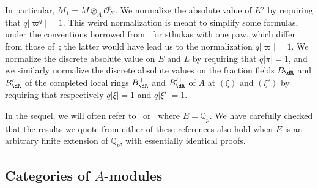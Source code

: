 In particular, $M_{1}=M\otimes_{A}\mathcal{O}_{K}^{\flat}$. We normalize the absolute value of $K^{\flat}$ by requiring that $q\left|\varpi^{q}\right|=1$. This weird normalization is meant to simplify some formulas, under the conventions borrowed from~\cite{BaMoSc16} for sthukas with one paw, which differ from those of~\cite{ScWe15}; the latter would have lead us to the normalization $q\left|\varpi\right|=1$. We normalize the discrete absolute value on $E$ and $L$ by requiring that $q\left|\pi\right|=1$, and we similarly normalize the discrete absolute values on the fraction fields $B_{\dR}$ and $B'_{\dR}$ of the completed local rings $B_{\dR}^{+}$ and $B_{\dR}^{\prime+}$ of $A$ at $(\xi)$ and $(\xi')$ by requiring that respectively $q\left|\xi\right|=1$ and $q\left|\xi'\right|=1$.
\begin{rema}
In the sequel, we will often refer to~\cite{BaMoSc16} or~\cite{ScWe15} where $E=\mathbb{Q}_{p}$. We have carefully checked that the results we quote from either of these references also hold when $E$ is an arbitrary finite extension of $\mathbb{Q}_{p}$, with essentially identical proofs.
\end{rema}

\subsection{Categories of \texorpdfstring{$A$}{A}-modules}

\subsubsection{}\label{subsec:ProjDimModA}

